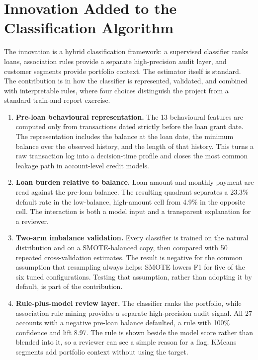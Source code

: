 \section{Innovation Added to the Classification Algorithm}
\label{sec:innovation}

The innovation is a hybrid classification framework: a supervised classifier ranks loans, association rules provide a separate high-precision audit layer, and customer segments provide portfolio context. The estimator itself is standard. The contribution is in how the classifier is represented, validated, and combined with interpretable rules, where four choices distinguish the project from a standard train-and-report exercise.

\begin{enumerate}
    \item \textbf{Pre-loan behavioural representation.} The 13 behavioural features are computed only from transactions dated strictly before the loan grant date. The representation includes the balance at the loan date, the minimum balance over the observed history, and the length of that history. This turns a raw transaction log into a decision-time profile and closes the most common leakage path in account-level credit models.
    \item \textbf{Loan burden relative to balance.} Loan amount and monthly payment are read against the pre-loan balance. The resulting quadrant separates a 23.3\% default rate in the low-balance, high-amount cell from 4.9\% in the opposite cell. The interaction is both a model input and a transparent explanation for a reviewer.
    \item \textbf{Two-arm imbalance validation.} Every classifier is trained on the natural distribution and on a SMOTE-balanced copy, then compared with 50 repeated cross-validation estimates. The result is negative for the common assumption that resampling always helps: SMOTE lowers F1 for five of the six tuned configurations. Testing that assumption, rather than adopting it by default, is part of the contribution.
    \item \textbf{Rule-plus-model review layer.} The classifier ranks the portfolio, while association rule mining provides a separate high-precision audit signal. All 27 accounts with a negative pre-loan balance defaulted, a rule with 100\% confidence and lift 8.97. The rule is shown beside the model score rather than blended into it, so a reviewer can see a simple reason for a flag. KMeans segments add portfolio context without using the target.
\end{enumerate}

